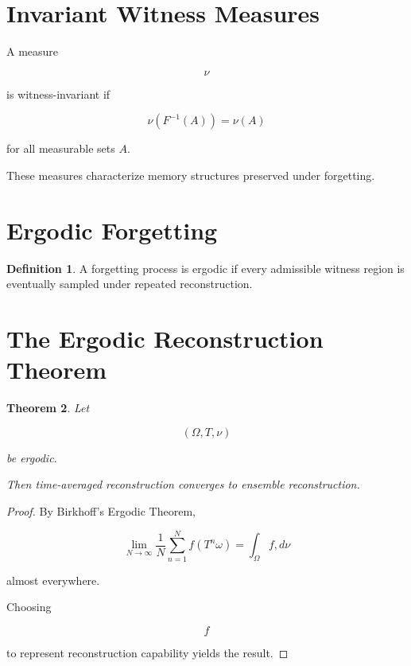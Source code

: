 \documentclass[12pt,oneside]{book}
\theoremstyle{plain} \newtheorem{theorem}{Theorem}[chapter] \newtheorem{lemma}[theorem]{Lemma} \newtheorem{proposition}[theorem]{Proposition} \newtheorem{corollary}[theorem]{Corollary}
\theoremstyle{definition} \newtheorem{definition}[theorem]{Definition} \newtheorem{axiom}[theorem]{Axiom} \newtheorem{construction}[theorem]{Construction}
\theoremstyle{remark} \newtheorem{remark}[theorem]{Remark} \newtheorem{example}[theorem]{Example}
\begin{document}
\section{Invariant Witness Measures}

A measure

\[
\nu
\]

is witness-invariant if

\[
\nu(F^{-1}(A))
=
\nu(A)
\]

for all measurable sets $A$.

These measures characterize memory structures preserved under forgetting.

\section{Ergodic Forgetting}

\begin{definition}

A forgetting process is ergodic if every admissible witness region is eventually sampled under repeated reconstruction.

\end{definition}

\section{The Ergodic Reconstruction Theorem}

\begin{theorem}

Let

\[
(\Omega,T,\nu)
\]

be ergodic.

Then time-averaged reconstruction converges to ensemble reconstruction.

\end{theorem}

\begin{proof}

By Birkhoff's Ergodic Theorem,

\[
\lim_{N\rightarrow\infty}
\frac1N
\sum_{n=1}^{N}
f(T^n\omega)
=
\int_\Omega f,d\nu
\]

almost everywhere.

Choosing

\[
f
\]

to represent reconstruction capability yields the result.

\end{proof}
\end{document}
